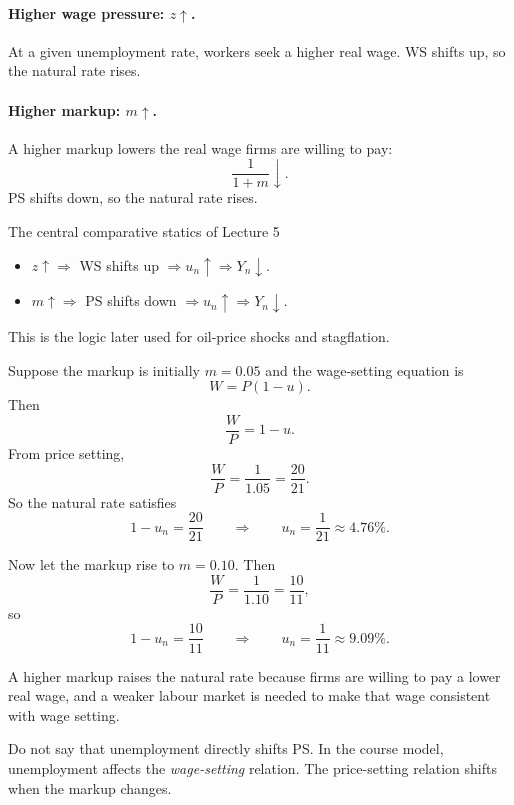 \paragraph{Higher wage pressure: $z\uparrow$.}
At a given unemployment rate, workers seek a higher real wage. WS shifts up, so the natural rate rises.

\paragraph{Higher markup: $m\uparrow$.}
A higher markup lowers the real wage firms are willing to pay:
\[
\frac{1}{1+m}\downarrow.
\]
PS shifts down, so the natural rate rises.

\begin{theorem}{The central comparative statics of Lecture 5}{}
\begin{itemize}[leftmargin=1.5em]
\item $z\uparrow \Rightarrow$ WS shifts up $\Rightarrow u_n\uparrow \Rightarrow Y_n\downarrow$.
\item $m\uparrow \Rightarrow$ PS shifts down $\Rightarrow u_n\uparrow \Rightarrow Y_n\downarrow$.
\end{itemize}
This is the logic later used for oil-price shocks and stagflation.
\end{theorem}

\begin{examplebox}[title={Worked Example: Natural unemployment with a higher markup}]
Suppose the markup is initially $m=0.05$ and the wage-setting equation is
\[
W=P(1-u).
\]
Then
\[
\frac{W}{P}=1-u.
\]
From price setting,
\[
\frac{W}{P}=\frac{1}{1.05}=\frac{20}{21}.
\]
So the natural rate satisfies
\[
1-u_n=\frac{20}{21}
\qquad\Rightarrow\qquad
u_n=\frac{1}{21}\approx 4.76\%.
\]

Now let the markup rise to $m=0.10$. Then
\[
\frac{W}{P}=\frac{1}{1.10}=\frac{10}{11},
\]
so
\[
1-u_n=\frac{10}{11}
\qquad\Rightarrow\qquad
u_n=\frac{1}{11}\approx 9.09\%.
\]

A higher markup raises the natural rate because firms are willing to pay a lower real wage, and a weaker labour market is needed to make that wage consistent with wage setting.
\end{examplebox}

\begin{commonmistake}
Do not say that unemployment directly shifts PS. In the course model, unemployment affects the \emph{wage-setting} relation. The price-setting relation shifts when the markup changes.
\end{commonmistake}

